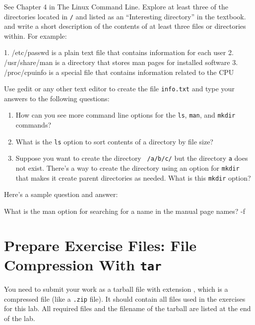 \documentclass[11pt]{cselabheader}
\begin{document}
\begin{ex}
See Chapter 4 in The Linux Command Line.
Explore at least three of the directories located in \texttt{/} and listed
as an ``Interesting directory'' in the textbook.
and write a short description of the contents of at least three files or
directories within. For example:

\begin{verbatimcode}
1. /etc/passwd is a plain text file that contains information for each user
2. /usr/share/man is a directory that stores man pages for installed software
3. /proc/cpuinfo is a special file that contains information related to the CPU 
\end{verbatimcode}
\end{ex}

\begin{ex}

Use gedit or any other text editor to create the file \texttt{info.txt}
and type your answers to the following questions:

\begin{enumerate}
\item How can you see more command line options for the \texttt{ls}, \texttt{man}, and \texttt{mkdir} commands?
\item What is the \texttt{ls} option to sort contents of a directory by file size?
\item Suppose you want to create the directory \texttt{~/a/b/c/} but the directory
      \texttt{a} does not exist. There's a way to create the directory using an
      option for \texttt{mkdir} that makes it create parent directories as needed.
      What is this \texttt{mkdir} option?
\end{enumerate}

Here's a sample question and answer: 

\begin{verbatimcode}
What is the man option for searching for a name in the manual page names?
-f
\end{verbatimcode}

\end{ex}

\section{Prepare Exercise Files: File Compression With \texttt{tar}}\label{%
sec:tar}

You need to submit your work as a tarball file with extension
, which is a compressed file (like a \texttt{.zip}
file). It should contain all files used in the exercises for this lab.
All required files and the filename of the tarball are listed at the end
of the lab.
\end{document}
